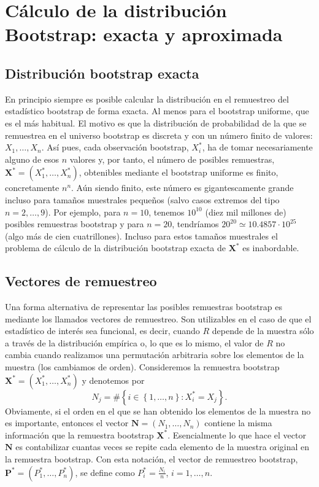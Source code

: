 \documentclass[]{book}
\theoremstyle{definition}
\theoremstyle{definition}
\theoremstyle{definition}
\theoremstyle{remark}
\begin{document}
\section{Cálculo de la distribución Bootstrap: exacta y
aproximada}\label{calculo-de-la-distribucion-bootstrap-exacta-y-aproximada}

\subsection{Distribución bootstrap
exacta}\label{distribucion-bootstrap-exacta}

En principio siempre es posible calcular la distribución en el
remuestreo del estadístico bootstrap de forma exacta. Al menos para el
bootstrap uniforme, que es el más habitual. El motivo es que la
distribución de probabilidad de la que se remuestrea en el universo
bootstrap es discreta y con un número finito de valores:
\(X_1,\ldots ,X_n\). Así pues, cada observación bootstrap,
\(X_i^{\ast}\), ha de tomar necesariamente alguno de esos \(n\) valores
y, por tanto, el número de posibles remuestras,
\(\mathbf{X}^{\ast}=\left( X_1^{\ast },\ldots ,X_n^{\ast} \right)\),
obtenibles mediante el bootstrap uniforme es finito, concretamente
\(n^{n}\). Aún siendo finito, este número es gigantescamente grande
incluso para tamaños muestrales pequeños (salvo casos extremos del tipo
\(n=2,\ldots ,9\)). Por ejemplo, para \(n=10\), tenemos \(10^{10}\)
(diez mil millones de) posibles remuestras bootstrap y para \(n=20\),
tendríamos \(20^{20}\simeq 10.4857\cdot 10^{25}\) (algo más de cien
cuatrillones). Incluso para estos tamaños muestrales el problema de
cálculo de la distribución bootstrap exacta de \(\mathbf{X}^{\ast}\) es
inabordable.

\subsection{Vectores de remuestreo}\label{vectores-de-remuestreo}

Una forma alternativa de representar las posibles remuestras bootstrap
es mediante los llamados vectores de remuestreo. Son utilizables en el
caso de que el estadístico de interés sea funcional, es decir, cuando
\(R\) depende de la muestra sólo a través de la distribución empírica o,
lo que es lo mismo, el valor de \(R\) no cambia cuando realizamos una
permutación arbitraria sobre los elementos de la muestra (los cambiamos
de orden). Consideremos la remuestra bootstrap
\(\mathbf{X}^{\ast} =\left( X_1^{\ast},\ldots ,X_n^{\ast} \right)\) y
denotemos por \[N_j=\#\left\{ i\in \left\{ 1,\ldots ,n\right\} : 
X_i^{\ast}=X_j\right\}.\] Obviamente, si el orden en el que se han
obtenido los elementos de la muestra no es importante, entonces el
vector \(\mathbf{N}=\left( N_1,\ldots ,N_n \right)\) contiene la misma
información que la remuestra bootstrap \(\mathbf{X}^{\ast}\).
Esencialmente lo que hace el vector \(\mathbf{N}\) es contabilizar
cuantas veces se repite cada elemento de la muestra original en la
remuestra bootstrap. Con esta notación, el vector de remuestreo
bootstrap,
\(\mathbf{P}^{\ast}=\left( P_1^{\ast},\ldots ,P_n^{\ast} \right)\), se
define como \(P_i^{\ast}=\frac{N_i}{n}\), \(i=1,\ldots ,n\).
\end{document}

